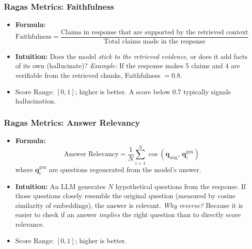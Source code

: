 \begin{frame}[fragile]
\frametitle{Ragas Metrics: Faithfulness}
\begin{itemize}
    \item \textbf{Formula:}
    \[
      \text{Faithfulness} = \frac{\text{Claims in response that are supported by the retrieved context}}{\text{Total claims made in the response}}
    \]
    \item \textbf{Intuition:} Does the model \textit{stick to the retrieved evidence}, or does it add facts of its own (hallucinate)?
    \newline \textit{Example:} If the response makes 5 claims and 4 are verifiable from the retrieved chunks, Faithfulness $= 0.8$.
    \item Score Range: $[0, 1]$; higher is better. A score below 0.7 typically signals hallucination.
\end{itemize}
\end{frame}

\begin{frame}[fragile]
\frametitle{Ragas Metrics: Answer Relevancy}
\begin{itemize}
    \item \textbf{Formula:}
    \[
      \text{Answer Relevancy} = \frac{1}{N}\sum_{i=1}^{N} \cos(\mathbf{q}_{\text{orig}},\, \mathbf{q}_i^{\text{gen}})
    \]
    where $\mathbf{q}_i^{\text{gen}}$ are questions regenerated from the model's answer.
    \item \textbf{Intuition:} An LLM generates $N$ hypothetical questions from the response. If those questions closely resemble the original question (measured by cosine similarity of embeddings), the answer is relevant.
    \newline \textit{Why reverse?} Because it is easier to check if an answer \textit{implies} the right question than to directly score relevance.
    \item Score Range: $[0, 1]$; higher is better.
\end{itemize}
\end{frame}

